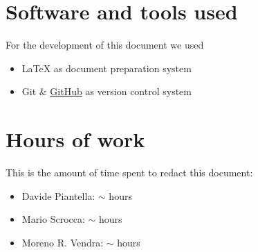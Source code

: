 \begin{appendices}

	\section{Software and tools used}
	For the development of this document we used
	\begin{itemize}
		\item \LaTeX{} as document preparation system
		\item Git \& \href{http://github.com}{GitHub} as version control system
	\end{itemize}
	
	\section{Hours of work}
	This is the amount of time spent to redact this document:
	\begin{itemize}
		\item Davide Piantella: $\sim$ hours
		\item Mario Scrocca: $\sim$ hours
		\item Moreno R. Vendra: $\sim$ hours
	\end{itemize}
	
\end{appendices}


\begin{thebibliography}{9}
\end{thebibliography}